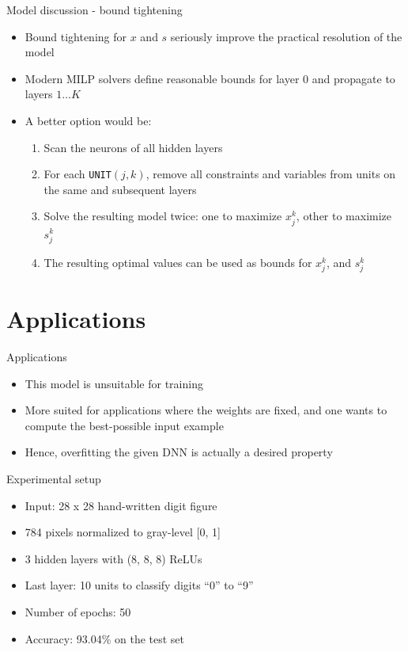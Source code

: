 \documentclass{beamer}
\newcommand{\UNIT}{\texttt{UNIT}$(j,k)$}
\begin{document}
\begin{frame}{Model discussion - bound tightening}
  \begin{itemize}
  \item Bound tightening for $x$ and $s$ seriously improve the practical resolution of the model
  \item Modern MILP solvers define reasonable bounds for layer $0$ and propagate to layers $1 \dots K$
  \item A better option would be:
    \begin{enumerate}
    \item Scan the neurons of all hidden layers
    \item For each \UNIT, remove all constraints and variables from units on the same and subsequent layers
    \item Solve the resulting model twice: one to maximize $x_j^k$, other to maximize $s_j^k$
    \item The resulting optimal values can be used as bounds for $x_j^k$, and $s_j^k$
    \end{enumerate}
  \end{itemize}
\end{frame}

\section{Applications}
\begin{frame}{Applications}
  \begin{itemize}
  \item This model is unsuitable for training
  \item More suited for applications where the weights are fixed, and one wants to compute the best-possible input example
  \item Hence, overfitting the given DNN is actually a desired property
  \end{itemize}
\end{frame}

\begin{frame}{Experimental setup}
  \begin{itemize}
  \item Input: 28 x 28 hand-written digit figure
  \item 784 pixels normalized to gray-level [0, 1]
  \item 3 hidden layers with (8, 8, 8) ReLUs
  \item Last layer: 10 units to classify digits ``0'' to ``9''
  \item Number of epochs: 50
  \item Accuracy: 93.04\% on the test set
  \end{itemize}
\end{frame}
\end{document}
